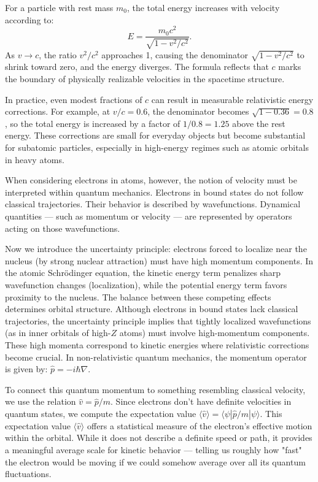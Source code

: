 For a particle with rest mass \( m_0 \), the total energy increases with velocity according to:
\[
E = \frac{m_0 c^2}{\sqrt{1 - v^2/c^2}}.
\]
As \( v \to c \), the ratio \( v^2/c^2 \) approaches 1, causing the denominator \( \sqrt{1 - v^2/c^2} \) to shrink toward zero, and the energy diverges. The formula reflects that \( c \) marks the boundary of physically realizable velocities in the spacetime structure.

In practice, even modest fractions of \( c \) can result in measurable relativistic energy corrections. For example, at \( v/c = 0.6 \), the denominator becomes \( \sqrt{1 - 0.36} = 0.8 \), so the total energy is increased by a factor of \( 1/0.8 = 1.25 \) above the rest energy. These corrections are small for everyday objects but become substantial for subatomic particles, especially in high-energy regimes such as atomic orbitals in heavy atoms.

When considering electrons in atoms, however, the notion of velocity must be interpreted within quantum mechanics. Electrons in bound states do not follow classical trajectories. Their behavior is described by wavefunctions. Dynamical quantities — such as momentum or velocity — are represented by operators acting on those wavefunctions.

Now we introduce the uncertainty principle: electrons forced to localize near the nucleus (by strong nuclear attraction) must have high momentum components. In the atomic Schrödinger equation, the kinetic energy term penalizes sharp wavefunction changes (localization), while the potential energy term favors proximity to the nucleus. The balance between these competing effects determines orbital structure. Although electrons in bound states lack classical trajectories, the uncertainty principle implies that tightly localized wavefunctions (as in inner orbitals of high-$Z$ atoms) must involve high-momentum components. These high momenta correspond to kinetic energies where relativistic corrections become crucial. In non-relativistic quantum mechanics, the momentum operator is given by: $\hat{p} = -i\hbar \nabla.$

To connect this quantum momentum to something resembling classical velocity, we use the relation \( \hat{v} = \hat{p}/m \). Since electrons don't have definite velocities in quantum states, we compute the expectation value \( \langle \hat{v} \rangle = \langle \psi | \hat{p}/m | \psi \rangle \). This expectation value \( \langle \hat{v} \rangle \) offers a statistical measure of the electron's effective motion within the orbital. While it does not describe a definite speed or path, it provides a meaningful average scale for kinetic behavior — telling us roughly how "fast" the electron would be moving if we could somehow average over all its quantum fluctuations.

